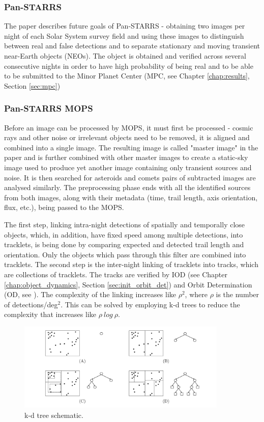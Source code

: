 \subsubsection{Pan-STARRS}
	
	The paper describes future goals of Pan-STARRS - obtaining two images per night of each Solar System survey field and using these images to distinguish between real and false detections and to separate stationary and moving transient near-Earth objects (NEOs). The object is obtained and verified across several consecutive nights in order to have high probability of being real and to be able to be submitted to the Minor Planet Center (MPC, see Chapter \ref{chap:results}, Section \ref{sec:mpc})
	
\subsubsection{Pan-STARRS MOPS}
	
	Before an image can be processed by MOPS, it must first be processed - cosmic rays and other noise or irrelevant objects need to be removed, it is aligned and combined into a single image. The resulting image is called "master image" in the paper and is further combined with other master images to create a static-sky image used to produce yet another image containing only transient sources and noise. It is then searched for asteroids and comets\; pairs of subtracted images are analysed similarly. The preprocessing phase ends with all the identified sources from both images, along with their metadata (time, trail length, axis orientation, flux, etc.), being passed to the MOPS.
	
	The first step, linking intra-night detections of spatially and temporally close objects, which, in addition, have fixed speed among multiple detections, into tracklets, is being done by comparing expected and detected trail length and orientation. Only the objects which pass through this filter are combined into tracklets. The second step is the inter-night linking of tracklets into tracks, which are collections of tracklets. The tracks are verified by IOD (see Chapter \ref{chap:object_dynamics}, Section \ref{sec:init_orbit_det}) and Orbit Determination (OD, see \citep{}). The complexity of the linking increases like $\rho^2$, where $\rho$ is the number of detections/deg$^2$. This can be solved by employing k-d trees to reduce the complexity that increases like $\rho\ log\ \rho$.
	
	\begin{figure}[H]
	\centering
	  \includegraphics[width=10cm]{images/kd_tree}
		  \caption{k-d tree schematic.}
	  \label{fig:kd_tree}
	\end{figure}
	
